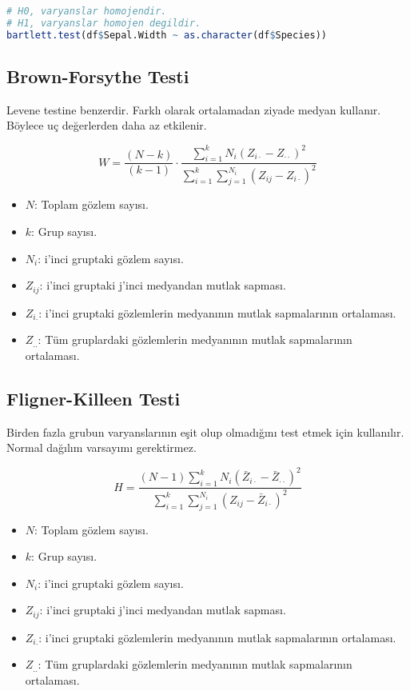 \begin{lstlisting}[language=R]
# H0, varyanslar homojendir.
# H1, varyanslar homojen degildir.
bartlett.test(df$Sepal.Width ~ as.character(df$Species))
\end{lstlisting}

\newpage

\subsection{Brown-Forsythe Testi}
Levene testine benzerdir. Farklı olarak ortalamadan ziyade medyan kullanır. Böylece uç değerlerden daha az etkilenir.

\[
W = \frac{(N - k)}{(k - 1)} \cdot \frac{\sum_{i=1}^{k} N_i (Z_{i \cdot} - Z_{\cdot \cdot})^2}{\sum_{i=1}^{k} \sum_{j=1}^{N_i} (Z_{ij} - Z_{i \cdot})^2}
\]

\begin{itemize}
	\item $N$: Toplam gözlem sayısı.
	\item $k$: Grup sayısı.
	\item $N_i$: i'inci gruptaki gözlem sayısı.
	\item $Z_{ij}$: i'inci gruptaki j'inci medyandan mutlak sapması.
	\item $Z_{i.}$: i'inci gruptaki gözlemlerin medyanının mutlak sapmalarının ortalaması.
	\item $Z_{..}$: Tüm gruplardaki gözlemlerin medyanının mutlak sapmalarının ortalaması.
\end{itemize}

\newpage

\subsection{Fligner-Killeen Testi}
Birden fazla grubun varyanslarının eşit olup olmadığını test etmek için kullanılır. Normal dağılım varsayımı gerektirmez. 

\[
H = \frac{(N - 1) \sum_{i=1}^{k} N_i (\bar{Z}_{i \cdot} - \bar{Z}_{\cdot \cdot})^2}{\sum_{i=1}^{k} \sum_{j=1}^{N_i} (Z_{ij} - \bar{Z}_{i \cdot})^2}
\]

\begin{itemize}
	\item $N$: Toplam gözlem sayısı.
	\item $k$: Grup sayısı.
	\item $N_i$: i'inci gruptaki gözlem sayısı.
	\item $Z_{ij}$: i'inci gruptaki j'inci medyandan mutlak sapması.
	\item $Z_{i.}$: i'inci gruptaki gözlemlerin medyanının mutlak sapmalarının ortalaması.
	\item $Z_{..}$: Tüm gruplardaki gözlemlerin medyanının mutlak sapmalarının ortalaması.
\end{itemize}

